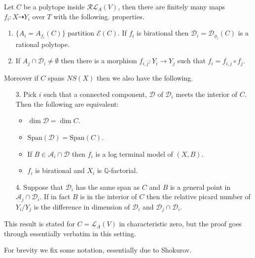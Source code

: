 \documentclass[a4paper,12pt]{amsart}
\begin{document}
	\begin{theorem}\label{assumptions}\cite[Theorem 3.3]{hacon2009sarkisov}
		Let $C$ be a polytope inside $\mathcal{RL}_{A}(V)$, then there are finitely many maps $f_{i}:X \dashrightarrow Y_{i}$ over $T$ with the following. properties.
		
		\begin{enumerate}
			\item $\{A_{i}=A_{f_{i}}(C)\}$ partition $\mathcal{E}(C)$. If $f_{i}$ is birational then $\mathcal{D}_{i}=\mathcal{D}_{\phi_{i}}(C)$ is a rational polytope.
			\item If $A_{j} \cap \mathcal{D}_{i} \neq \emptyset$ then there is a morphism $f_{i,j}:Y_{i} \to Y_{j}$ such that $f_{i}=f_{i,j} \circ f_{j}$.
		\end{enumerate}
		
		Moreover if $C$ spans $NS(X)$ then we also have the following.
		
		\begin{enumerate}
			\item[3.] Pick $i$ such that a connected component, $\mathcal{D}$ of $\mathcal{D}_{i}$ meets the interior of $C$. Then the following are equivalent:
			\begin{itemize}
				\item $\dim \mathcal{D}= \dim C$.
				\item $\text{Span}(\mathcal{D})=\text{Span}(C)$.
				\item If $B \in \mathcal{A}_{i} \cap \mathcal{D}$ then $f_{i}$ is a log terminal model of $(X,B)$.
				\item $f_{i}$ is birational and $X_{i}$ is $\mathbb{Q}$-factorial.
			\end{itemize} 
			
			\item[4.] Suppose that $\mathcal{D}_{i}$ has the same span as $C$ and $B$ is a general point in $\mathcal{A}_{j} \cap \mathcal{D}_{i}$. If in fact $B$ is in the interior of $C$ then the relative picard number of $Y_{i}/Y_{j}$ is the difference in dimension of $\mathcal{D}_{i}$ and $\mathcal{D}_{j} \cap \mathcal{D}_{i}$. 
			
		\end{enumerate}
	\end{theorem}
	
	This result is stated for $C=\mathcal{L}_{A}(V)$ in characteristic zero, but the proof goes through essentially verbatim in this setting.
	
	For brevity we fix some notation, essentially due to Shokurov.
	
\end{document}
